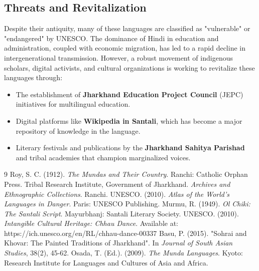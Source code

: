 \documentclass{article}
\begin{document}
\subsection{Threats and Revitalization}
Despite their antiquity, many of these languages are classified as "vulnerable" or "endangered" by UNESCO. The dominance of Hindi in education and administration, coupled with economic migration, has led to a rapid decline in intergenerational transmission. However, a robust movement of indigenous scholars, digital activists, and cultural organizations is working to revitalize these languages through:
\begin{itemize}
    \item The establishment of \textbf{Jharkhand Education Project Council} (JEPC) initiatives for multilingual education.
    \item Digital platforms like \textbf{Wikipedia in Santali}, which has become a major repository of knowledge in the language.
    \item Literary festivals and publications by the \textbf{Jharkhand Sahitya Parishad} and tribal academies that champion marginalized voices.
\end{itemize}

\begin{thebibliography}{9}
 Roy, S. C. (1912). \textit{The Mundas and Their Country}. Ranchi: Catholic Orphan Press.
 Tribal Research Institute, Government of Jharkhand. \textit{Archives and Ethnographic Collections}. Ranchi.
 UNESCO. (2010). \textit{Atlas of the World’s Languages in Danger}. Paris: UNESCO Publishing.
 Murmu, R. (1949). \textit{Ol Chiki: The Santali Script}. Mayurbhanj: Santali Literary Society.
 UNESCO. (2010). \textit{Intangible Cultural Heritage: Chhau Dance}. Available at: https://ich.unesco.org/en/RL/chhau-dance-00337
 Basu, P. (2015). "Sohrai and Khovar: The Painted Traditions of Jharkhand". In \textit{Journal of South Asian Studies}, 38(2), 45-62.
 Osada, T. (Ed.). (2009). \textit{The Munda Languages}. Kyoto: Research Institute for Languages and Cultures of Asia and Africa.
\end{thebibliography}
\end{document}
